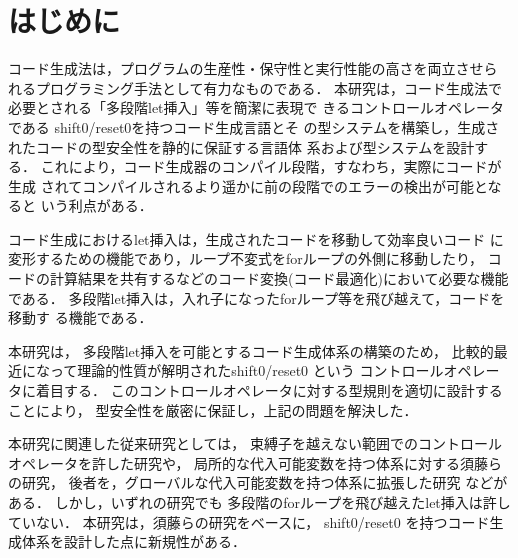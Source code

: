 
\section{はじめに}
コード生成法は，プログラムの生産性・保守性と実行性能の高さを両立させら
れるプログラミング手法として有力なものである．
本研究は，コード生成法で必要とされる「多段階let挿入」等を簡潔に表現で
きるコントロールオペレータである shift0/reset0を持つコード生成言語とそ
の型システムを構築し，生成されたコードの型安全性を静的に保証する言語体
系および型システムを設計する．
これにより，コード生成器のコンパイル段階，すなわち，実際にコードが生成
されてコンパイルされるより遥かに前の段階でのエラーの検出が可能となると
いう利点がある．

コード生成におけるlet挿入は，生成されたコードを移動して効率良いコード
に変形するための機能であり，ループ不変式をforループの外側に移動したり，
コードの計算結果を共有するなどのコード変換(コード最適化)において必要な機能である．
多段階let挿入は，入れ子になったforループ等を飛び越えて，コードを移動す
る機能である．



本研究は，
多段階let挿入を可能とするコード生成体系の構築のため，
比較的最近になって理論的性質が解明されたshift0/reset0 という
コントロールオペレータに着目する．
このコントロールオペレータに対する型規則を適切に設計することにより，
型安全性を厳密に保証し，上記の問題を解決した．

本研究に関連した従来研究としては，
束縛子を越えない範囲でのコントロールオペレータを許した研究や，
局所的な代入可能変数を持つ体系に対する須藤らの研究\cite{Sudo2014}，
後者を，グローバルな代入可能変数を持つ体系に拡張した研究
\cite{Aplas2016}などがある．
しかし，いずれの研究でも 多段階のforループを飛び越えたlet挿入は許していない．
本研究は，須藤らの研究をベースに，
shift0/reset0 を持つコード生成体系を設計した点に新規性がある．
